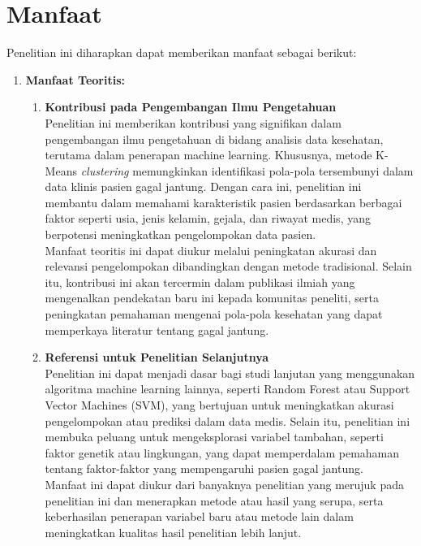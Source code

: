 \documentclass[english,12pt,a4paper,openany]{book}
\begin{document}
	\section{Manfaat}
	Penelitian ini diharapkan dapat memberikan manfaat sebagai berikut:
	\begin{enumerate}
		\item \textbf{Manfaat Teoritis:}
		\begin{enumerate}
			\item \textbf{Kontribusi pada Pengembangan Ilmu Pengetahuan}\\
			Penelitian ini memberikan kontribusi yang signifikan dalam pengembangan ilmu pengetahuan di bidang analisis data kesehatan, terutama dalam penerapan machine learning. Khususnya, metode K-Means \textit{clustering} memungkinkan identifikasi pola-pola tersembunyi dalam data klinis pasien gagal jantung. Dengan cara ini, penelitian ini membantu dalam memahami karakteristik pasien berdasarkan berbagai faktor seperti usia, jenis kelamin, gejala, dan riwayat medis, yang berpotensi meningkatkan pengelompokan data pasien.\\
			
			Manfaat teoritis ini dapat diukur melalui peningkatan akurasi dan relevansi pengelompokan dibandingkan dengan metode tradisional. Selain itu, kontribusi ini akan tercermin dalam publikasi ilmiah yang mengenalkan pendekatan baru ini kepada komunitas peneliti, serta peningkatan pemahaman mengenai pola-pola kesehatan yang dapat memperkaya literatur tentang gagal jantung.\\
			\item \textbf{Referensi untuk Penelitian Selanjutnya}\\
			Penelitian ini dapat menjadi dasar bagi studi lanjutan yang menggunakan algoritma machine learning lainnya, seperti Random Forest atau Support Vector Machines (SVM), yang bertujuan untuk meningkatkan akurasi pengelompokan atau prediksi dalam data medis. Selain itu, penelitian ini membuka peluang untuk mengeksplorasi variabel tambahan, seperti faktor genetik atau lingkungan, yang dapat memperdalam pemahaman tentang faktor-faktor yang mempengaruhi pasien gagal jantung.\\
			
			Manfaat ini dapat diukur dari banyaknya penelitian yang merujuk pada penelitian ini dan menerapkan metode atau hasil yang serupa, serta keberhasilan penerapan variabel baru atau metode lain dalam meningkatkan kualitas hasil penelitian lebih lanjut.
		\end{enumerate}
		

\end{enumerate}
\end{document}
